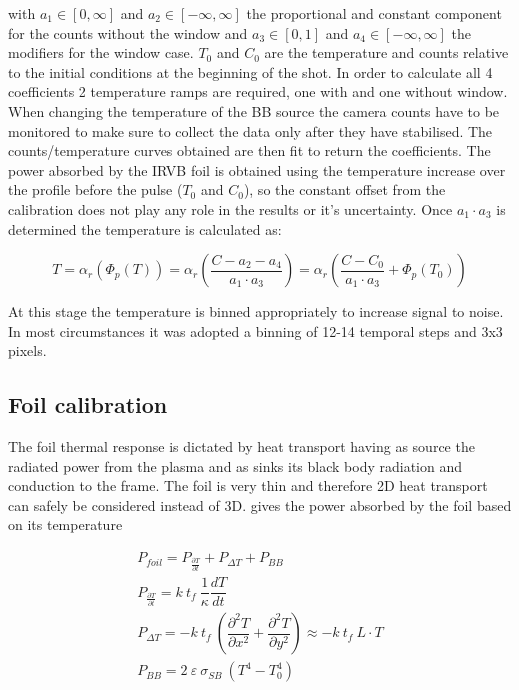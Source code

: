 with $a_1\in[0,\infty]$ and $a_2\in[-\infty,\infty]$ the proportional and constant component for the counts without the window and $a_3\in[0,1]$ and $a_4\in[-\infty,\infty]$ the modifiers for the window case. $T_0$ and $C_0$ are the temperature and counts relative to the initial conditions at the beginning of the shot.
In order to calculate all 4 coefficients 2 temperature ramps are required, one with and one without window. When changing the temperature of the BB source the camera counts have to be monitored to make sure to collect the data only after they have stabilised.
The counts/temperature curves obtained are then fit to return the coefficients. The power absorbed by the IRVB foil is obtained using the temperature increase over the profile before the pulse ($T_0$ and $C_0$), so the constant offset from the calibration does not play any role in the results or it’s uncertainty.
Once $a_1 \cdot a_3$ is determined the temperature is calculated as:

\begin{equation}
T = {\alpha}_r ( {\Phi}_p(T)) = {\alpha}_r \left (\frac {C - a_2 - a_4} {a_1 \cdot a_3} \right ) = {\alpha}_r \left (\frac {C - C_0} {a_1 \cdot a_3} + {\Phi}_p (T_0) \right )
\label{eq:BBphotons4}
\end{equation}

At this stage the temperature is binned appropriately to increase signal to noise. In most circumstances it was adopted a binning of 12-14 temporal steps and 3x3 pixels.

\subsection{Foil calibration}
The foil thermal response is dictated by heat transport having as source the radiated power from the plasma and as sinks its black body radiation and conduction to the frame. The foil is very thin and therefore 2D heat transport can safely be considered instead of 3D.  gives the power absorbed by the foil based on its temperature

\begin{equation}
\begin{split}
P_{foil}= P_{\frac {\partial T} {\partial t}}+P_{\Delta T}+P_{BB}\\
P_{\frac {\partial T} {\partial t}}=k \: t_f \: \dfrac{1}{\kappa} \dfrac{dT}{dt} \\
 P_{\Delta T} = -k \: t_f \:  \left( \dfrac{\partial^2 T}{\partial x^2} + \dfrac{\partial^2 T}{\partial y^2} \right) \approx -k \: t_f \: L \cdot T \\ P_{BB} = 2 \: \varepsilon \: \sigma_{SB} \: (T^4 - T_0^4)
\label{eq:heat2d}
\end{split}
\end{equation}

